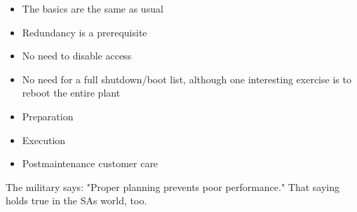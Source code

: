 \documentclass{slides}
\newcommand{\bi}{\begin{itemize}}
\newcommand{\ei}{\end{itemize}}
\begin{document}

\bi
\item The basics are the same as usual
\item Redundancy is a prerequisite
\item No need to disable access
\item No need for a full shutdown/boot list, although one
  interesting exercise is to reboot the entire plant
\ei


\bi
\item Preparation
\item Execution
\item Postmaintenance customer care
\ei

The military says: "Proper planning prevents poor performance."  That
saying holds true in the SAs world, too.
\end{document}
